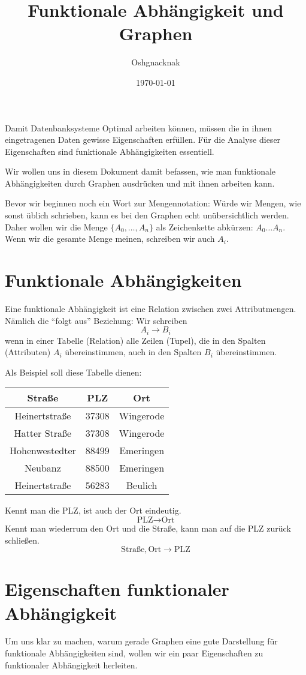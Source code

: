 \documentclass[a4paper, ngerman]{article}
\title{Funktionale Abhängigkeit und Graphen}
\author{Oshgnacknak}
\date{\today}
\begin{document}
\maketitle

Damit Datenbanksysteme Optimal arbeiten können,
müssen die in ihnen eingetragenen Daten
gewisse Eigenschaften erfüllen.
Für die Analyse dieser Eigenschaften
sind funktionale Abhängigkeiten essentiell.

Wir wollen uns in diesem Dokument damit befassen,
wie man funktionale Abhängigkeiten durch Graphen ausdrücken
und mit ihnen arbeiten kann.

Bevor wir beginnen noch
ein Wort zur Mengennotation:
Würde wir Mengen, wie sonst üblich schrieben,
kann es bei den Graphen echt unübersichtlich werden.
Daher wollen wir die Menge $\{ A_0, \dots, A_n \}$
als Zeichenkette abkürzen: $A_0 \dots A_n$.
Wenn wir die gesamte Menge meinen, 
schreiben wir auch $A_i$.

\section*{Funktionale Abhängigkeiten}
Eine funktionale Abhängigkeit
ist eine Relation zwischen zwei Attributmengen.
Nämlich die \enquote{folgt aus} Beziehung:
Wir schreiben
$$
    A_i \to B_i
$$
wenn in einer Tabelle (Relation) alle Zeilen (Tupel),
die in den Spalten (Attributen) $A_i$ übereinstimmen,
auch in den Spalten $B_i$ übereinstimmen.

Als Beispiel soll diese Tabelle dienen:
\begin{center}
\begin{tabular}{ c | c | c }
    Straße & PLZ & Ort \\
    \hline
    Heinertstraße & 37308 & Wingerode \\
    Hatter Straße & 37308 & Wingerode \\
    Hohenwestedter & 88499 & Emeringen \\
    Neubanz & 88500 & Emeringen \\
    Heinertstraße & 56283 & Beulich \\
\end{tabular}
\end{center}
Kennt man die PLZ, ist auch der Ort eindeutig.
$$
    \text{PLZ} \to \text{Ort}
$$
Kennt man wiederrum den Ort und die Straße,
kann man auf die PLZ zurück schließen.
$$
    \text{Straße}, \text{Ort} \to \text{PLZ}
$$

\section*{Eigenschaften funktionaler Abhängigkeit}
Um uns klar zu machen,
warum gerade Graphen eine gute Darstellung für
funktionale Abhängigkeiten sind,
wollen wir ein paar Eigenschaften zu
funktionaler Abhängigkeit herleiten.
\end{document}
